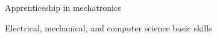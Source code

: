 \begin{tightemize}
    \item Apprenticeship in mechatronics
    \item Electrical, mechanical, and computer science basic skills
\end{tightemize}